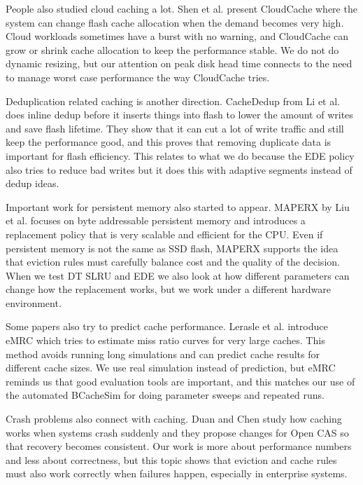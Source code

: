 \documentclass[sigconf]{acmart}
\begin{document}
People also studied cloud caching a lot. Shen et al. \cite{shen2016cloudcache} present CloudCache where the system can change flash cache allocation when the demand becomes very high. Cloud workloads sometimes have a burst with no warning, and CloudCache can grow or shrink cache allocation to keep the performance stable. We do not do dynamic resizing, but our attention on peak disk head time connects to the need to manage worst case performance the way CloudCache tries.

Deduplication related caching is another direction. CacheDedup from Li et al. \cite{li2016cachededup} does inline dedup before it inserts things into flash to lower the amount of writes and save flash lifetime. They show that it can cut a lot of write traffic and still keep the performance good, and this proves that removing duplicate data is important for flash efficiency. This relates to what we do because the EDE policy also tries to reduce bad writes but it does this with adaptive segments instead of dedup ideas.

Important work for persistent memory also started to appear. MAPERX by Liu et al. \cite{liu2020maperx} focuses on byte addressable persistent memory and introduces a replacement policy that is very scalable and efficient for the CPU. Even if persistent memory is not the same as SSD flash, MAPERX supports the idea that eviction rules must carefully balance cost and the quality of the decision. When we test DT SLRU and EDE we also look at how different parameters can change how the replacement works, but we work under a different hardware environment.

Some papers also try to predict cache performance. Lerasle et al. \cite{lerasle2015emrc} introduce eMRC which tries to estimate miss ratio curves for very large caches. This method avoids running long simulations and can predict cache results for different cache sizes. We use real simulation instead of prediction, but eMRC reminds us that good evaluation tools are important, and this matches our use of the automated BCacheSim for doing parameter sweeps and repeated runs.

Crash problems also connect with caching. Duan and Chen \cite{Duan2025CrashConsistency} study how caching works when systems crash suddenly and they propose changes for Open CAS so that recovery becomes consistent. Our work is more about performance numbers and less about correctness, but this topic shows that eviction and cache rules must also work correctly when failures happen, especially in enterprise systems.
\end{document}
